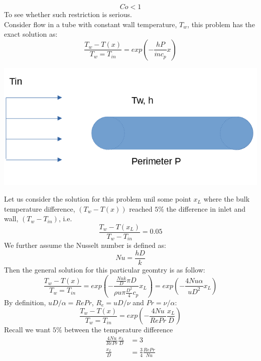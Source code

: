 \documentclass[11pt]{article}
\begin{document}
\begin{equation}
\boxed{Co < 1}
\end{equation}
To see whether such restriction is serious. \\
Consider flow in a tube with constant wall temperature, \(T_w\), this problem has the exact solution as:
\begin{equation*}
\frac{T_w - T(x)}{T_w=T_{in}} = exp\left(-\frac{hP}{\dot{m}c_p}x \right)
\end{equation*}
\begin{center}
\includegraphics[scale=0.5]{../pic/tube_twall.png}
\end{center}
Let us consider the solution for this problem unil some point \(x_L\) where the bulk temperature difference, \((T_w - T(x))\)
reached \(5\%\) the difference in inlet and wall, \((T_w-T_{in})\), i.e.
\begin{equation*}
\frac{T_w-T(x_L)}{T_w-T_{in}} = 0.05
\end{equation*}
We further assume the Nusselt number is defined as:
\begin{equation*}
Nu = \frac{hD}{k}
\end{equation*}
Then the general solution for this particular geomtry is as follow:
\begin{equation*}
\frac{T_w - T(x)}{T_w=T_{in}} = exp\left(  -\frac{   \frac{Nuk}{D} \pi D } {\rho u \pi \frac{D^2}{4}  c_p} x_L \right) = exp\left(- \frac{4Nu\alpha}{uD^2}x_L   \right)
\end{equation*}
By definition, \(uD/\alpha = RePr\), \(R_e = uD/\nu\) and \(Pr = \nu/\alpha\):
\begin{equation*}
\frac{T_w - T(x)}{T_w=T_{in}} = exp\left(- \frac{4Nu}{RePr}\frac{x_L}{D}   \right)
\end{equation*}
Recall we want \(5\%\) between the temperature difference
\begin{equation*}
\begin{aligned}
\frac{4Nu}{RePr}\frac{x_L}{D} &= 3\\
\frac{x_L}{D} &= \frac{3}{4}\frac{RePr}{Nu}
\end{aligned}
\end{equation*}
\end{document}
